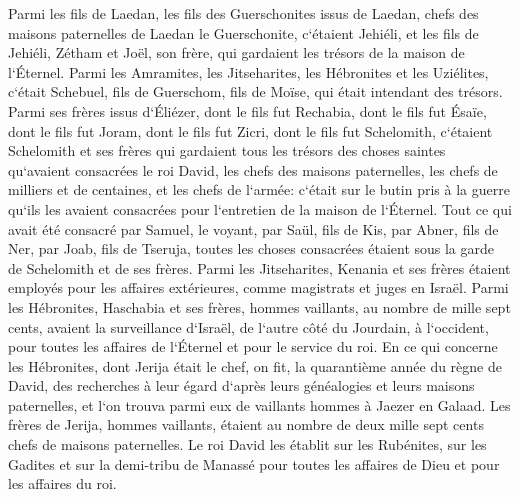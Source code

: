 \verse Parmi les fils de Laedan, les fils des Guerschonites issus de Laedan, chefs des maisons paternelles de Laedan le Guerschonite, c`étaient Jehiéli, 
\verse et les fils de Jehiéli, Zétham et Joël, son frère, qui gardaient les trésors de la maison de l`Éternel. 
\verse Parmi les Amramites, les Jitseharites, les Hébronites et les Uziélites, 
\verse c`était Schebuel, fils de Guerschom, fils de Moïse, qui était intendant des trésors. 
\verse Parmi ses frères issus d`Éliézer, dont le fils fut Rechabia, dont le fils fut Ésaïe, dont le fils fut Joram, dont le fils fut Zicri, dont le fils fut Schelomith, 
\verse c`étaient Schelomith et ses frères qui gardaient tous les trésors des choses saintes qu`avaient consacrées le roi David, les chefs des maisons paternelles, les chefs de milliers et de centaines, et les chefs de l`armée: 
\verse c`était sur le butin pris à la guerre qu`ils les avaient consacrées pour l`entretien de la maison de l`Éternel. 
\verse Tout ce qui avait été consacré par Samuel, le voyant, par Saül, fils de Kis, par Abner, fils de Ner, par Joab, fils de Tseruja, toutes les choses consacrées étaient sous la garde de Schelomith et de ses frères. 
\verse Parmi les Jitseharites, Kenania et ses frères étaient employés pour les affaires extérieures, comme magistrats et juges en Israël. 
\verse Parmi les Hébronites, Haschabia et ses frères, hommes vaillants, au nombre de mille sept cents, avaient la surveillance d`Israël, de l`autre côté du Jourdain, à l`occident, pour toutes les affaires de l`Éternel et pour le service du roi. 
\verse En ce qui concerne les Hébronites, dont Jerija était le chef, on fit, la quarantième année du règne de David, des recherches à leur égard d`après leurs généalogies et leurs maisons paternelles, et l`on trouva parmi eux de vaillants hommes à Jaezer en Galaad. 
\verse Les frères de Jerija, hommes vaillants, étaient au nombre de deux mille sept cents chefs de maisons paternelles. Le roi David les établit sur les Rubénites, sur les Gadites et sur la demi-tribu de Manassé pour toutes les affaires de Dieu et pour les affaires du roi. 

\chapter{}

